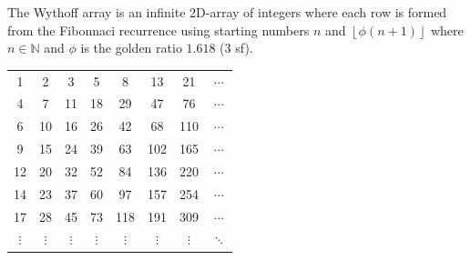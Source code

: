 \documentclass[addpoints]{exam}
\begin{document}
\begin{questions}
The Wythoff array is an infinite 2D-array of integers where each row is formed from the Fibonnaci recurrence using starting numbers $n$ and $\left \lfloor{\phi(n+1)}\right \rfloor$ where $n \in \mathbb{N}$ and $\phi$ is the golden ratio $1.618$ (3 sf).

\begin{center}
\begin{tabular}{c c c c c c c c}
 \color{blue}1 & 2 & 3 & 5 & 8 & 13 & 21 & $\cdots$\\
 4 & \color{blue}7 & 11 & 18 & 29 & 47 & 76 & $\cdots$\\
 6 & 10 & \color{blue}16 & 26 & 42 & 68 & 110 & $\cdots$\\
 9 & 15 & 24 & \color{blue}39 & 63 & 102 & 165 & $\cdots$ \\
 12 & 20 & 32 & 52 & \color{blue}84 & 136 & 220 & $\cdots$ \\
 14 & 23 & 37 & 60 & 97 & \color{blue}157 & 254 & $\cdots$\\
 17 & 28 & 45 & 73 & 118 & 191 & \color{blue}309 & $\cdots$\\
 $\vdots$ & $\vdots$ & $\vdots$ & $\vdots$ & $\vdots$ & $\vdots$ & $\vdots$ & \color{blue}$\ddots$\\
 

\end{tabular}
\end{center}


\end{questions}
\end{document}
